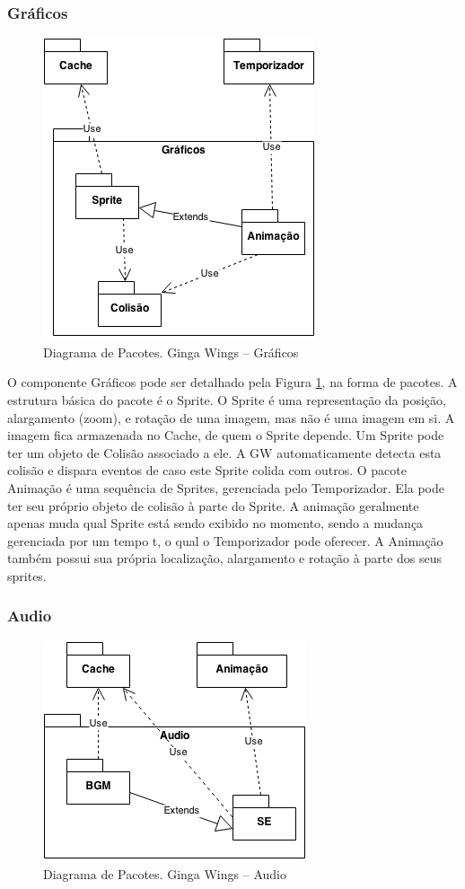 \documentclass[
	12pt,				%
	openright,			%
	oneside,			%
	a4paper,			%
	brazil,				%
	]{abntex2}
\begin{document}
\subsubsection{Gráficos}

\begin{figure}
\centering
\includegraphics{diagrama_graficos.png}
\caption{Diagrama de Pacotes. Ginga Wings – Gráficos}
\label{fig:diagramaGraficos}
\end{figure}

O componente Gráficos pode ser detalhado pela Figura \ref{fig:diagramaGraficos}, na forma de pacotes. A estrutura básica do pacote é o Sprite. O Sprite é uma representação da posição, alargamento (zoom), e rotação de uma imagem, mas não é uma imagem em si. A imagem fica armazenada no Cache, de quem o Sprite depende. Um Sprite pode ter um objeto de Colisão associado a ele. A GW automaticamente detecta esta colisão e dispara eventos de caso este Sprite colida com outros. O pacote Animação é uma sequência de Sprites, gerenciada pelo Temporizador. Ela pode ter seu próprio objeto de colisão à parte do Sprite. A animação geralmente apenas muda qual Sprite está sendo exibido no momento, sendo a mudança gerenciada por um tempo t, o qual o Temporizador pode oferecer. A Animação também possui sua própria localização, alargamento e rotação à parte dos seus sprites.

\subsubsection{Audio}

\begin{figure}
\centering
\includegraphics{diagrama_audio.png}
\caption{Diagrama de Pacotes. Ginga Wings – Audio}
\label{fig:diagramaAudio}
\end{figure}
\end{document}
